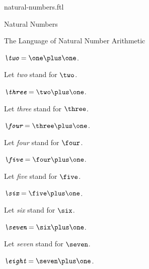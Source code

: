 \documentclass{naproche-library}
\begin{document}
\begin{smodule}{natural-numbers.ftl}
\begin{sfragment}{Natural Numbers}
\begin{sfragment}{The Language of Natural Number Arithmetic}
    \begin{definition}[forthel,id=TwoSig]
      $\emph{\two}=\one\plus\one$.

      Let \emph{two} stand for $\two$.
    \end{definition}


    \begin{definition}[forthel,id=ThreeSig]
      $\emph{\three}=\two\plus\one$.

      Let \emph{three} stand for $\three$.
    \end{definition}


    \begin{definition}[forthel,id=FourSig]
      $\emph{\four}=\three\plus\one$.

      Let \emph{four} stand for $\four$.
    \end{definition}


    \begin{definition}[forthel,id=FiveSig]
      $\emph{\five}=\four\plus\one$.

      Let \emph{five} stand for $\five$.
    \end{definition}


    \begin{definition}[forthel,id=SixSig]
      $\emph{\six}=\five\plus\one$.

      Let \emph{six} stand for $\six$.
    \end{definition}


    \begin{definition}[forthel,id=SevenSig]
      $\emph{\seven}=\six\plus\one$.

      Let \emph{seven} stand for $\seven$.
    \end{definition}


    \begin{definition}[forthel,id=EightSig]
      $\emph{\eight}=\seven\plus\one$.


\end{definition}
\end{sfragment}
\end{sfragment}
\end{smodule}
\end{document}
